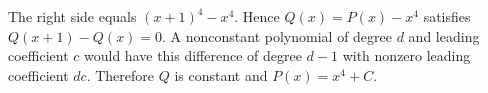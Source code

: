 The right side equals $(x+1)^4-x^4$. Hence $Q(x)=P(x)-x^4$ satisfies $Q(x+1)-Q(x)=0$. A nonconstant polynomial of degree $d$ and leading coefficient $c$ would have this difference of degree $d-1$ with nonzero leading coefficient $dc$. Therefore $Q$ is constant and $\boxed{P(x)=x^4+C}$.
